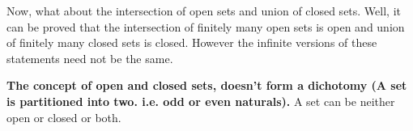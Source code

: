 \documentclass{article}
\newtheorem{example}{Example}
\newtheorem{solution}{Solution}
\begin{document}
\noindent\fbox{\parbox{0.475\textwidth}{\begin{example}{
 What about: $\displaystyle{(-\infty,\,a]}$ or $\displaystyle{[a,\,\infty)}$
}\end{example}\begin{solution}{
  Exercise
}\end{solution}}}\vspace{10pt}

Now, what about the intersection of open sets and union of closed sets. Well, it can be proved that the intersection of finitely many open sets is open and union of finitely many closed sets is closed. However the infinite versions of these statements need not be the same.

{\color{red} \textbf{The concept of open and closed sets, doesn't form a dichotomy (A set is partitioned into two. i.e. odd or even naturals). }} A set can be neither open or closed or both.
\end{document}
